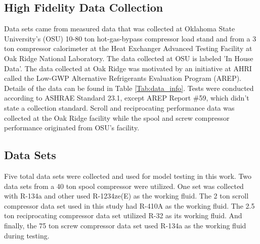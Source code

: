 \documentclass[preprint,11pt,authoryear]{elsarticle}
\begin{document}
\subsection{High Fidelity Data Collection}

Data sets came from measured data that was collected at Oklahoma State University's (OSU) 10-80 ton hot-gas-bypass compressor load stand and from a 3 ton compressor calorimeter at the Heat Exchanger Advanced Testing Facility at Oak Ridge National Laboratory. The data collected at OSU is labeled 'In House Data'. The data collected at Oak Ridge was motivated by an initiative at AHRI called the Low-GWP Alternative Refrigerants Evaluation Program (AREP). Details of the data can be found in Table \ref{Tab:data_info}. Tests were conducted according to ASHRAE Standard 23.1, except AREP Report \#59, which didn't state a collection standard. Scroll and reciprocating performance data was collected at the Oak Ridge facility while the spool and screw compressor performance originated from OSU's facility. 

\subsection{Data Sets}

Five total data sets were collected and used for model testing in this work. Two data sets from a 40 ton spool compressor were utilized. One set was collected with R-134a and other used R-1234ze(E) as the working fluid. The 2 ton scroll compressor data set used in this study had R-410A as the working fluid. The 2.5 ton reciprocating compressor data set utilized R-32 as its working fluid. And finally, the 75 ton screw compressor data set used R-134a as the working fluid during testing.

\begin{table}[h]
\caption{Information on the data sets collected.}
\label{Tab:data_info}
\begin{center}
\end{center}
\end{table}
\end{document}
